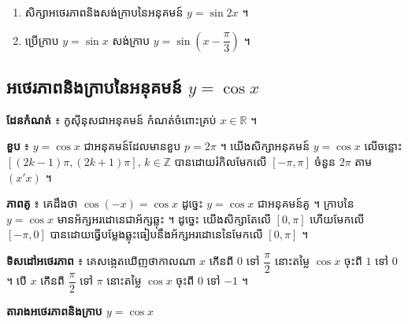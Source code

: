 \begin{pro}
\begin{enumerate}[1]
  \item សិក្សាអថេរភាពនិងសង់ក្រាបនៃអនុគមន៍ $y = \sin 2x$ ។
  \item ប្រើក្រាប $y = \sin x$ សង់ក្រាប $y = \sin\left(x - \dfrac{\pi}{3}\right)$ ។
\end{enumerate}
\end{pro}

\subsection{អថេរភាពនិងក្រាបនៃអនុគមន៍ \texorpdfstring{$y = \cos x$}{y = cos x}}

\textbf{ដែនកំណត់} ៖ កូស៊ីនុសជាអនុគមន៍ កំណត់ចំពោះគ្រប់ $x \in \mathbb{R}$ ។

\textbf{ខួប} ៖ $y = \cos x$ ជាអនុគមន៍ដែលមានខួប $p = 2\pi$ ។ យើងសិក្សាអនុគមន៍ $y = \cos x$ លើចន្លោះ $[(2k - 1)\pi, (2k + 1)\pi]$, $k \in \mathbb{Z}$ បានដោយរំកិលមែកលើ $[-\pi, \pi]$ ចំនួន $2\pi$ តាម $(x'x)$ ។

\textbf{ភាពគូ} ៖ គេដឹងថា $\cos(-x) = \cos x$ ដូច្នេះ $y = \cos x$ ជាអនុគមន៍គូ ។ ក្រាបនៃ $y = \cos x$ មានអ័ក្សអរដោនេជាអ័ក្សឆ្លុះ ។ ដូច្នេះ យើងសិក្សាតែលើ $[0, \pi]$ ហើយមែកលើ $[-\pi, 0]$ បានដោយធ្វើបម្លែងឆ្លុះធៀបនឹងអ័ក្សអរដោនេនៃមែកលើ $[0, \pi]$ ។

\textbf{ទិសដៅអថេរភាព} ៖ គេសង្កេតឃើញថាកាលណា $x$ កើនពី $0$ ទៅ $\dfrac{\pi}{2}$ នោះតម្លៃ $\cos x$ ចុះពី $1$ ទៅ $0$ ។ បើ $x$ កើនពី $\dfrac{\pi}{2}$ ទៅ $\pi$ នោះតម្លៃ $\cos x$ ចុះពី $0$ ទៅ $-1$ ។

\textbf{តារាងអថេរភាពនិងក្រាប $y = \cos x$}
\begin{center}

\end{center}

